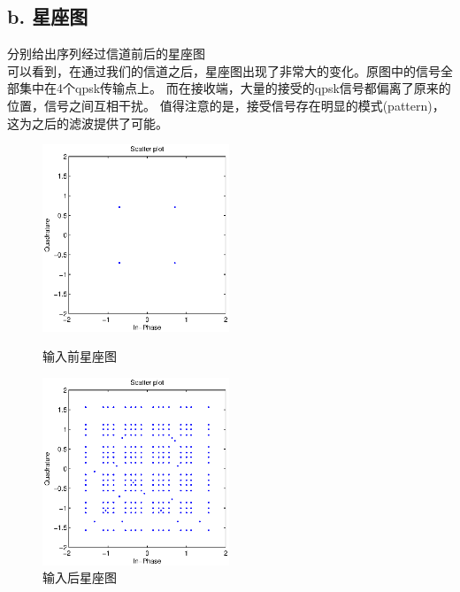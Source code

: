 \documentclass{article}
\begin{document}
\subsection*{b. 星座图}分别给出序列经过信道前后的星座图\\
可以看到，在通过我们的信道之后，星座图出现了非常大的变化。原图中的信号全部集中在4个qpsk传输点上。
而在接收端，大量的接受的qpsk信号都偏离了原来的位置，信号之间互相干扰。
值得注意的是，接受信号存在明显的模式(pattern)，这为之后的滤波提供了可能。
\begin{figure}[h]
\begin{minipage}[t]{0.5\linewidth}
\centering
\includegraphics[width=2.2in]{2.eps}
\caption{输入前星座图}
\label{fig:side:a}
\end{minipage}%
\begin{minipage}[t]{0.5\linewidth}
\centering
\includegraphics[width=2.2in]{3.eps}
\caption{输入后星座图}
\label{fig:side:b}
\end{minipage}
\end{figure}
\end{document}
